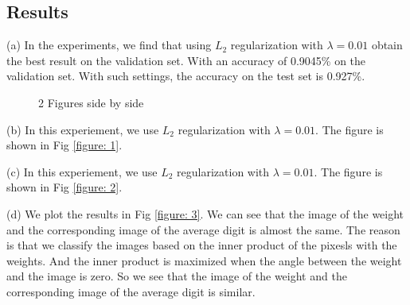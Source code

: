\documentclass{article} %
\begin{document}
\subsection{Results}
(a) In the experiments, we find that using $L_2$ regularization with $\lambda = 0.01$ obtain the best result on the validation set. With an accuracy of 0.9045\% on the validation set. With such settings, the accuracy on the test set is 0.927\%.


\begin{figure}%
	\centering
	\qquad
	\caption{2 Figures side by side}%
	\label{fig:example}%
\end{figure}



(b) In this experiement, we use  $L_2$ regularization with $\lambda = 0.01$. The figure is shown in Fig \ref{figure: 1}. 


(c) In this experiement, we use  $L_2$ regularization with $\lambda = 0.01$. The figure is shown in Fig \ref{figure: 2}.

(d) We plot the results in Fig \ref{figure: 3}. We can see that the image of the weight and the corresponding image of the average digit is almost the same. The reason is that we classify the images based on the inner product of the pixesls with the weights. And the inner product is maximized when the angle between the weight and the image is zero. So we see that the image of the weight and the corresponding image of the average digit is similar.
\end{document}
